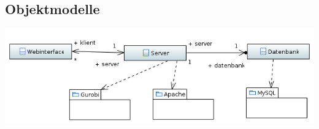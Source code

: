 \documentclass[parskip=full]{scrartcl}
\newcommand{\swtLabel}[1]{\textbf{/#1\arabic*0/}}
\begin{document}
\begin{enumerate} [label=\swtLabel{B}, itemsep=2em]
\end{enumerate}



\subsection{Objektmodelle}

\includegraphics[width=\linewidth]{diagramme_pflichtenheft/ClassDiagram.PNG}

\end{document}
